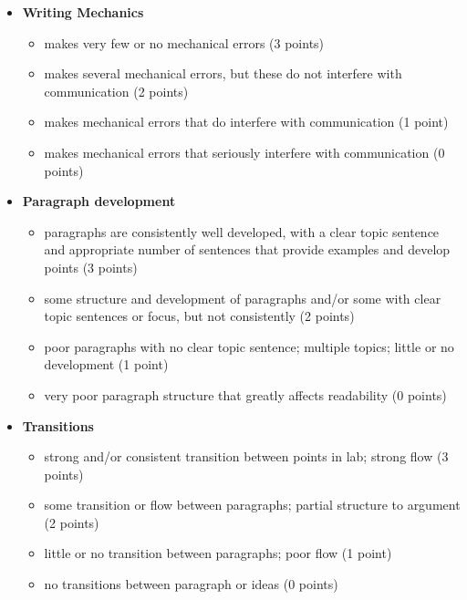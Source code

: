 \documentclass[11pt,letterpaper]{article}
\begin{document}
\begin{itemize}
\item \textbf{Writing Mechanics}
\begin{itemize}
\item[\underline{\hspace{.2in}}]  makes very few or no mechanical errors (3 points)
\item[\underline{\hspace{.2in}}] makes several mechanical errors, but these do not interfere with communication (2 points)
\item[\underline{\hspace{.2in}}] makes mechanical errors that do interfere with communication (1 point)
\item[\underline{\hspace{.2in}}] makes mechanical errors that seriously interfere with communication (0 points)
\end{itemize}

\item \textbf{Paragraph development} 
\begin{itemize}
\item[\underline{\hspace{.2in}}]  paragraphs are consistently well developed, with a clear topic sentence and appropriate number of sentences that provide examples and develop points (3 points)
\item[\underline{\hspace{.2in}}]  some structure and development of paragraphs and/or some with clear topic sentences or focus, but not consistently (2 points)
\item[\underline{\hspace{.2in}}] poor paragraphs with no clear topic sentence; multiple topics; little or no 
development (1 point)
\item[\underline{\hspace{.2in}}] very poor paragraph structure that greatly affects readability (0 points)
\end{itemize}  
 
\item \textbf{Transitions}
\begin{itemize}
\item[\underline{\hspace{.2in}}]  strong and/or consistent transition between points in lab; strong flow  (3 points)
\item[\underline{\hspace{.2in}}]  some transition or flow between paragraphs; partial structure to argument (2 points)
\item[\underline{\hspace{.2in}}] little or no transition between paragraphs; poor flow (1 point) 
\item[\underline{\hspace{.2in}}] no transitions between paragraph or ideas (0 points)
\end{itemize}


\end{itemize}
\end{document}
